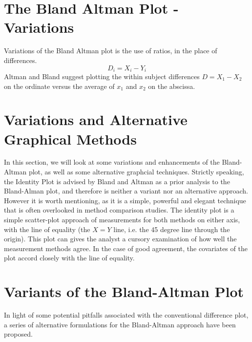 \documentclass[12pt, a4paper]{report}
\theoremstyle{plain}
\theoremstyle{definition}
\theoremstyle{remark}
\begin{document}
	
	
	
	
	


	\section{The Bland Altman Plot - Variations}
	Variations of the Bland Altman plot is the use of ratios, in the
	place of differences.
	\begin{equation}
		D_{i} = X_{i} - Y_{i}   \label{BA01}
	\end{equation}
	Altman and Bland suggest plotting the within subject differences $
	D = X_{1} - X_{2} $ on the ordinate versus the average of $x_{1}$
	and  $x_{2}$ on the abscissa.
	\section{Variations and Alternative Graphical Methods}
	In this section, we will look at some variations and enhancements of the Bland-Altman plot, as well as some alternative graphcial techniques. Strictly speaking, the Identity Plot is advised by Bland and Altman as a prior analysis to the Bland-Alman plot, and therefore is neither a variant nor an alternative approach. However it is worth mentioning, as it is a simple, powerful and elegant technique that is often overlooked in method comparison studies. The identity plot is a simple scatter-plot approach of measurements for both methods on either axis, with the line of equality (the $X=Y$ line, i.e. the 45 degree line through the origin). This plot can gives the analyst a cursory examination of how well the measurement methods agree. In the case of good agreement, the covariates of the plot accord closely with the line of equality.
	
	
	
		\section{Variants of the Bland-Altman Plot}
		In light of some potential pitfalls associated with the conventional difference plot, a series of alternative formulations for the Bland-Altman approach have been proposed.
		
\end{document}
